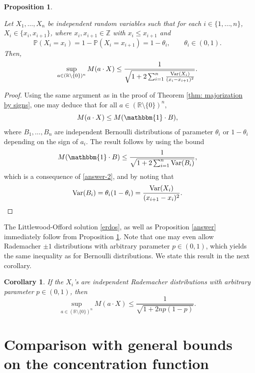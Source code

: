 \documentclass[11pt]{article}
\newtheorem{prop}[thm]{Proposition}
\newtheorem{coro}[thm]{Corollary}
\newcommand{\R}{\mathbb{R}}
\DeclareMathOperator{\Var}{Var}
\newcommand{\1}{[1]}
\newcommand{\Z}{\mathbb{Z}}
\newcommand{\Prob}{\mathbb{P}}
\def\Var{{\rm Var}}
\begin{document}
\begin{prop}\label{extend}

Let $X_1, \dots, X_n$ be independent random variables such that for each $i \in \{1, \dots, n\}$, $X_i \in \{x_i, x_{i+1}\}$, where $x_i, x_{i+1} \in \Z$ with $x_i \leq x_{i+1}$ and 
$$ \Prob(X_i = x_i) = 1 - \Prob(X_i = x_{i+1}) = 1-\theta_i, \qquad \theta_i \in (0,1). $$
Then,
$$ \sup_{a \in (\R \setminus \{0\})^n} M(a \cdot X) \leq \frac{1}{\sqrt{1 + 2\sum_{i=1}^n \frac{\Var(X_i)}{(x_i-x_{i+1})^2}}}. $$

\end{prop}

\begin{proof}
Using the same argument as in the proof of Theorem \ref{thm: majorization by signs}, one may deduce that for all $a \in (\R \setminus \{0\})^n$,
$$ M(a \cdot X) \leq M(\mathbbm{1} \cdot B), $$
where $B_1, \dots, B_n$ are independent Bernoulli distributions of parameter $\theta_i$ or $1-\theta_i$ depending on the sign of $a_i$.
The result follows by using the bound
$$ M(\mathbbm{1} \cdot B) \leq \frac{1}{\sqrt{1 + 2\sum_{i=1}^n \Var(B_i)}}, $$
which is a consequence of \eqref{answer-2}, and by noting that
$$ \Var(B_i) = \theta_i(1-\theta_i) = \frac{\Var(X_i)}{(x_{i+1} - x_i)^2}. $$
\end{proof}


The Littlewood-Offord solution \eqref{erdos}, as well as Proposition \ref{answer} immediately follow from Proposition \ref{extend}. Note that one may even allow Rademacher $\pm 1$ distributions with arbitrary parameter $p \in (0,1)$, which yields the same inequality as for Bernoulli distributions. We state this result in the next corollary.

\begin{coro}

If the $X_i$'s are independent Rademacher distributions with arbitrary parameter $p \in (0,1)$, then
$$ \sup_{a \in (\R \setminus \{0\})^n} M(a \cdot X) \leq \frac{1}{\sqrt{1 + 2np(1-p)}}. $$

\end{coro}






\section{Comparison with general bounds on the concentration function}\label{sec-4}
\end{document}
